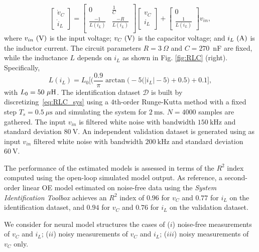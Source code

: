\documentclass{article}
\newcommand{\Did}{{\mathcal{D}}}
\begin{document}
\begin{equation}
\label{eq:RLC_sys}
\begin{bmatrix}
\dot v_C\\
\dot i_L
\end{bmatrix} = 
\begin{bmatrix}
  0           & \tfrac{1}{C}\\
 \tfrac{-1}{L(i_L)} & \tfrac{-R}{L(i_L)}\\
\end{bmatrix}
\begin{bmatrix}
v_C\\
i_L
\end{bmatrix} +
\begin{bmatrix}
0\\
\tfrac{1}{L(i_L)}
\end{bmatrix} 
v_{in},
\end{equation}
where $v_{in}~\rm(V)$ is the input voltage; $v_C~\rm(V)$ is the capacitor voltage; and $i_L~\rm(A)$ is the inductor current. The circuit parameters $R=3~\Omega$ and $C=270$~nF are fixed, while the inductance $L$ depends on $i_L$ as shown in Fig. \ref{fig:RLC} (right). Specifically, 
\begin{equation*}
 L(i_L) = L_0\bigg[\bigg(\frac{0.9}{\pi}\arctan\big(-\!5(|i_L|-5\big)+0.5\bigg) + 0.1 \bigg], 
\end{equation*}
with $L_0=50~{\mu \rm  H}$. 
The identification dataset $\Did$ is built by  discretizing~\eqref{eq:RLC_sys} using a $4$th-order Runge-Kutta method with a fixed step $T_s=0.5~\mu \text{s}$ and simulating the system for  $2~\text{ms}$.  $N=4000$ samples are  gathered. The input $v_{in}$ is filtered white noise with bandwidth $150~\text{kHz}$ and standard deviation $80~\text{V}$. An independent validation dataset is generated using as input $v_{in}$ filtered white noise   with  bandwidth $200~\text{kHz}$ and standard deviation $60~\text{V}$. 

The performance of the estimated models is assessed in terms of the $R^2$ index computed using the open-loop simulated model output.  
As  reference, a second-order linear OE model estimated on noise-free data using the \emph{System Identification Toolbox}  \citep{ljung:2015system} achieves an $R^2$ index of $0.96$ for $v_C$ and $0.77$ for $i_L$ on the identification dataset, and $0.94$ for $v_C$ and $0.76$ for $i_L$ on the validation dataset. 

 We consider for neural model structures the cases of ($i$) noise-free measurements of $v_C$ and $i_L$; ($ii$) noisy measurements of $v_C$ and $i_L$; ($iii$) noisy measurements of $v_C$ only. 
\end{document}
